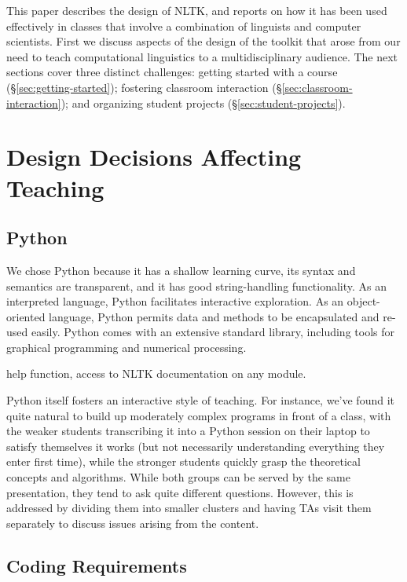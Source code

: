 \documentclass[11pt]{article}
\begin{document}
This paper describes the design of NLTK, and reports on how it has
been used effectively in classes that involve a combination of
linguists and computer scientists.  First we discuss aspects of the
design of the toolkit that arose from our need to teach computational
linguistics to a multidisciplinary audience.  The next sections
cover three distinct challenges:
getting started with a course (\S\ref{sec:getting-started});
fostering classroom interaction (\S\ref{sec:classroom-interaction});
and organizing student projects (\S\ref{sec:student-projects}).

\section{Design Decisions Affecting Teaching}
\label{sec:design}

\subsection{Python}

We chose Python because it has a shallow learning curve, its syntax
and semantics are transparent, and it has good string-handling
functionality.  As an interpreted language, Python facilitates
interactive exploration.  As an object-oriented language, Python
permits data and methods to be encapsulated and re-used easily.  Python comes with an extensive
standard library, including tools for graphical programming and
numerical processing.

help function, access to NLTK documentation on any module.

Python itself fosters an
interactive style of teaching.  For instance, we've found it quite
natural to build up moderately complex programs in front of a class,
with the weaker students transcribing it into a Python session on
their laptop to satisfy themselves it works (but not necessarily
understanding everything they enter first time), while the stronger
students quickly grasp the theoretical concepts and algorithms.  While
both groups can be served by the same presentation, they tend to ask
quite different questions.  However, this is addressed by dividing
them into smaller clusters and having TAs visit them separately to
discuss issues arising from the content.

\subsection{Coding Requirements}
\end{document}
